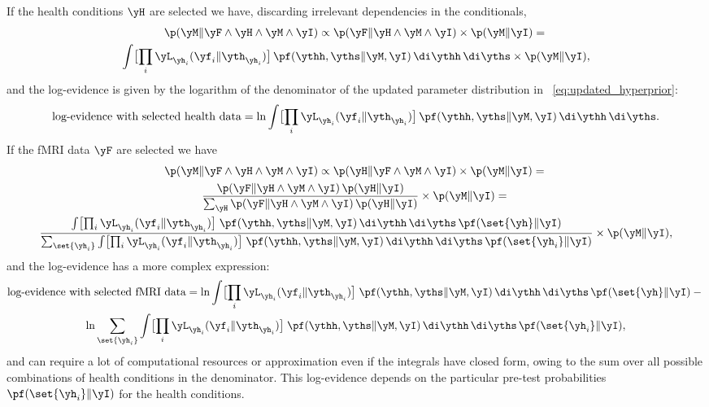 If the health conditions $\yH$ are selected we have, discarding irrelevant
dependencies in the conditionals,
\begin{multline}
  \label{eq:evidence_likelihood}
  \p(\yM \| \yF \land \yH \land  \yM \land \yI) \propto
  \p(\yF \| \yH \land  \yM \land \yI)\times
  \p(\yM \|  \yI)
  = {}\\
\int \bigl[ \prod_i \yL_{\yh_i}(\yf_i \| \yth_{\yh_i}) \bigr]\,
\pf(\ythh, \yths \|\yM ,\yI) \,\di\ythh\,\di\yths
\times     \p(\yM \|  \yI),
\end{multline}
and the log-evidence is given by the logarithm of the denominator of the
updated parameter distribution in \eqn~\eqref{eq:updated_hyperprior}:
\begin{equation}
  \label{eq:log-evidence_health_selected}
  \text{log-evidence with selected health data} =
  \ln \int \bigl[ \prod_i \yL_{\yh_i}(\yf_i \| \yth_{\yh_i}) \bigr]\,
\pf(\ythh, \yths \|\yM ,\yI) \,\di\ythh\,\di\yths.
\end{equation}
If the fMRI data $\yF$ are selected we have
\begin{multline}
  \label{eq:evidence_likelihood_selected_fmri}
  \p(\yM \| \yF \land \yH \land  \yM \land \yI) \propto
  \p(\yH \| \yF \land  \yM \land \yI)\times
  \p(\yM \|  \yI)
  ={}\\
  \frac{\p(\yF \| \yH \land  \yM \land \yI)\,\p(\yH \| \yI)}{
    \sum_{\yH}\p(\yF \| \yH \land  \yM \land \yI)\,\p(\yH \| \yI)}
  \times
  \p(\yM \|  \yI)
  = {}\\
\frac{\int \bigl[ \prod_i \yL_{\yh_i}(\yf_i \| \yth_{\yh_i}) \bigr]\;
  \pf(\ythh, \yths \|\yM ,\yI) \,\di\ythh\,\di\yths
  \,\pf(\set{\yh} \| \yI)}{
\sum_{\set{\yh_i}}\int \bigl[ \prod_i \yL_{\yh_i}(\yf_i \| \yth_{\yh_i}) \bigr]\;
  \pf(\ythh, \yths \|\yM ,\yI) \,\di\ythh\,\di\yths
  \,\pf(\set{\yh_i} \| \yI)
}
\times     \p(\yM \|  \yI),
\end{multline}
and the log-evidence has a more complex expression:
\begin{multline}
  \label{eq:log-evidence_fmri_selected}
  \text{log-evidence with selected fMRI data} =
\ln\int \bigl[ \prod_i \yL_{\yh_i}(\yf_i \| \yth_{\yh_i}) \bigr]\;
  \pf(\ythh, \yths \|\yM ,\yI) \,\di\ythh\,\di\yths
  \,\pf(\set{\yh} \| \yI) -{}\\
\ln\sum_{\set{\yh_i}}\int \bigl[ \prod_i \yL_{\yh_i}(\yf_i \| \yth_{\yh_i}) \bigr]\;
  \pf(\ythh, \yths \|\yM ,\yI) \,\di\ythh\,\di\yths
  \,\pf(\set{\yh_i} \| \yI),
\end{multline}
and can require a lot of computational resources or approximation even if
the integrals have closed form, owing to the sum over all possible
combinations of health conditions in the denominator. This log-evidence
depends on the particular pre-test probabilities $\pf(\set{\yh_i} \| \yI)$
for the health conditions.

